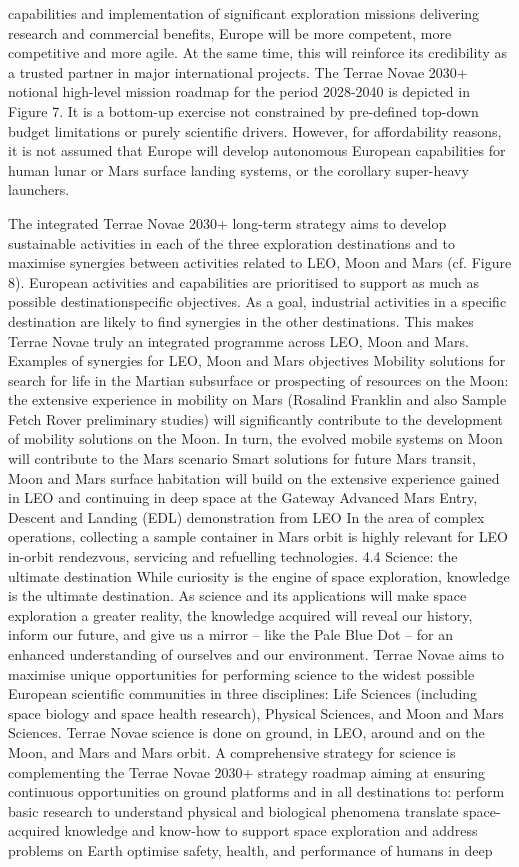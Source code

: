 \documentclass[12pt]{article}
\begin{document}
capabilities and implementation of significant exploration missions delivering research and commercial benefits, Europe will be more competent, more competitive and more agile. At the same time, this will reinforce its credibility as a trusted partner in major international projects. The Terrae Novae 2030+ notional high-level mission roadmap for the period 2028-2040 is depicted in Figure 7. It is a bottom-up exercise not constrained by pre-defined top-down budget limitations or purely scientific drivers. However, for affordability reasons, it is not assumed that Europe will develop autonomous European capabilities for human lunar or Mars surface landing systems, or the corollary super-heavy launchers.

The integrated Terrae Novae 2030+ long-term strategy aims to develop sustainable activities in each of the three exploration destinations and to maximise synergies between activities related to LEO, Moon and Mars (cf. Figure 8). European activities and capabilities are prioritised to support as much as possible destinationspecific objectives. As a goal, industrial activities in a specific destination are likely to find synergies in the other destinations. This makes Terrae Novae truly an integrated programme across LEO, Moon and Mars. Examples of synergies for LEO, Moon and Mars objectives Mobility solutions for search for life in the Martian subsurface or prospecting of resources on the Moon: the extensive experience in mobility on Mars (Rosalind Franklin and also Sample Fetch Rover preliminary studies) will significantly contribute to the development of mobility solutions on the Moon. In turn, the evolved mobile systems on Moon will contribute to the Mars scenario Smart solutions for future Mars transit, Moon and Mars surface habitation will build on the extensive experience gained in LEO and continuing in deep space at the Gateway Advanced Mars Entry, Descent and Landing (EDL) demonstration from LEO In the area of complex operations, collecting a sample container in Mars orbit is highly relevant for LEO in-orbit rendezvous, servicing and refuelling technologies. 4.4 Science: the ultimate destination While curiosity is the engine of space exploration, knowledge is the ultimate destination. As science and its applications will make space exploration a greater reality, the knowledge acquired will reveal our history, inform our future, and give us a mirror – like the Pale Blue Dot – for an enhanced understanding of ourselves and our environment. Terrae Novae aims to maximise unique opportunities for performing science to the widest possible European scientific communities in three disciplines: Life Sciences (including space biology and space health research), Physical Sciences, and Moon and Mars Sciences. Terrae Novae science is done on ground, in LEO, around and on the Moon, and Mars and Mars orbit. A comprehensive strategy for science is complementing the Terrae Novae 2030+ strategy roadmap aiming at ensuring continuous opportunities on ground platforms and in all destinations to: perform basic research to understand physical and biological phenomena translate space-acquired knowledge and know-how to support space exploration and address problems on Earth optimise safety, health, and performance of humans in deep 
\end{document}
